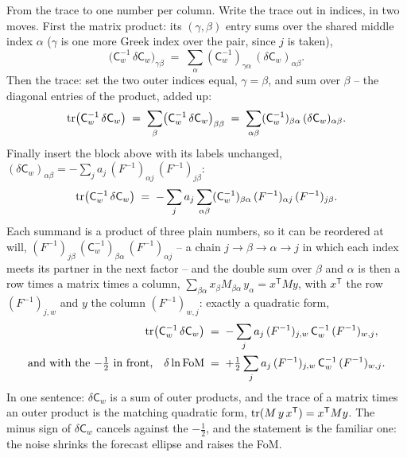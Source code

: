 \documentclass[11pt]{article}
\newcommand{\Cov}{\mathsf{C}}
\newcommand{\T}{^{\mathsf{T}}}
\begin{document}
From the trace to one number per column.  Write the trace out in
indices, in two moves.  First the matrix product: its
$(\gamma, \beta)$ entry sums over the shared middle index $\alpha$
($\gamma$ is one more Greek index over the pair, since $j$ is taken),
\begin{equation*}
  \bigl(\Cov_w^{-1}\,\delta\Cov_w\bigr)_{\gamma\beta}
  \;=\; \sum_{\alpha} (\Cov_w^{-1})_{\gamma\alpha}\,
  (\delta\Cov_w)_{\alpha\beta} .
\end{equation*}
Then the trace: set the two outer indices equal, $\gamma = \beta$, and
sum over $\beta$ -- the diagonal entries of the product, added up:
\begin{equation*}
  {\rm tr}\bigl(\Cov_w^{-1}\,\delta\Cov_w\bigr)
  \;=\; \sum_{\beta}\bigl(\Cov_w^{-1}\,\delta\Cov_w\bigr)_{\beta\beta}
  \;=\; \sum_{\alpha\beta} (\Cov_w^{-1})_{\beta\alpha}\,
  (\delta\Cov_w)_{\alpha\beta} .
\end{equation*}
Finally insert the block above with its labels unchanged,
$(\delta\Cov_w)_{\alpha\beta}
= -\sum_j a_j\,(F^{-1})_{\alpha j}\,(F^{-1})_{j\beta}$:
\begin{equation*}
  {\rm tr}\bigl(\Cov_w^{-1}\,\delta\Cov_w\bigr)
  \;=\; -\sum_j a_j \sum_{\alpha\beta}
  (\Cov_w^{-1})_{\beta\alpha}\,
  (F^{-1})_{\alpha j}\,(F^{-1})_{j\beta} .
\end{equation*}
Each summand is a product of three plain numbers, so it can be
reordered at will,
$(F^{-1})_{j\beta}\,(\Cov_w^{-1})_{\beta\alpha}\,(F^{-1})_{\alpha j}$
-- a chain $j \to \beta \to \alpha \to j$ in which each index meets
its partner in the next factor -- and the double sum over $\beta$ and
$\alpha$ is then a row times a matrix times a column,
$\sum_{\beta\alpha} x_\beta M_{\beta\alpha}\,y_\alpha = x\T M y$, with
$x\T$ the row $(F^{-1})_{j,w}$ and $y$ the column $(F^{-1})_{w,j}$:
exactly a quadratic form,
\begin{align*}
  {\rm tr}\bigl(\Cov_w^{-1}\,\delta\Cov_w\bigr)
  \;&=\; -\sum_j a_j\,
  (F^{-1})_{j,w}\,\Cov_w^{-1}\,(F^{-1})_{w,j} ,
  \\
  \text{and with the $-\tfrac{1}{2}$ in front,}\quad
  \delta\ln{\rm FoM}
  \;&=\; +\tfrac{1}{2}\sum_j a_j\,
  (F^{-1})_{j,w}\,\Cov_w^{-1}\,(F^{-1})_{w,j} .
\end{align*}
In one sentence: $\delta\Cov_w$ is a sum of outer products, and the
trace of a matrix times an outer product is the matching quadratic
form, ${\rm tr}(M\,y\,x\T) = x\T M y$.  The minus sign of
$\delta\Cov_w$ cancels against the $-\tfrac{1}{2}$, and the statement
is the familiar one: the noise shrinks the forecast ellipse and raises
the FoM.
\end{document}
